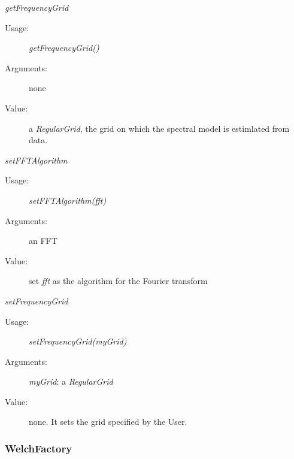 \begin{description}
\begin{description}
\item \textit{getFrequencyGrid}
\begin{description}
\item[Usage:] \textit{getFrequencyGrid()}
\item[Arguments:] none
\item[Value:]   a \textit{RegularGrid}, the grid on which the  spectral model is estimlated from data.
\end{description}
\bigskip

\item \textit{setFFTAlgorithm}
\begin{description}
\item[Usage:] \textit{setFFTAlgorithm(fft)}
\item[Arguments:] an FFT
\item[Value:]   set \textit{fft} as the algorithm for the Fourier transform
\end{description}
\bigskip

\item \textit{setFrequencyGrid}
\begin{description}
\item[Usage:] \textit{setFrequencyGrid(myGrid)}
\item[Arguments:] \textit{myGrid}: a \textit{RegularGrid}
\item[Value:]   none. It sets the grid specified by the User.
\end{description}


\end{description}


\end{description}

\newpage
\subsubsection{WelchFactory}

